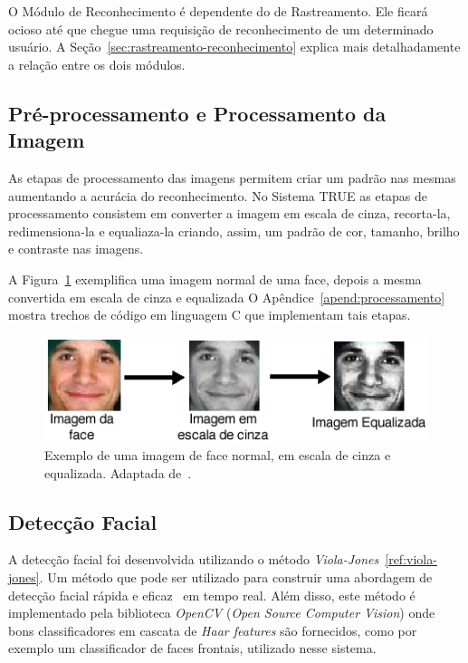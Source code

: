 	O Módulo de Reconhecimento é dependente do de Rastreamento. Ele ficará ocioso
	até que chegue uma requisição de reconhecimento de um determinado usuário. A
	Seção~\ref{sec:rastreamento-reconhecimento} explica mais detalhadamente a
	relação entre os dois módulos.

	\subsection{Pré-processamento e Processamento da Imagem}
		
		As etapas de processamento das imagens permitem criar um padrão nas mesmas
		aumentando a acurácia do reconhecimento. No Sistema TRUE as etapas de
		processamento consistem em converter a imagem em escala de cinza, recorta-la,
		redimensiona-la e equaliaza-la criando, assim, um padrão de cor, tamanho,
		brilho e contraste nas imagens.

		A Figura~\ref{fig:greyscale} exemplifica uma imagem normal de uma face,
		depois a mesma convertida em escala de cinza e equalizada O
		Apêndice~\ref{apend:processamento} mostra trechos de código em linguagem C
		que implementam tais etapas.

		\begin{figure}[hbt]
			\begin{center}
				\includegraphics[scale=0.7]{figuras/4.ProblemaEProposta/greyscale.png}
			\end{center}
			\caption{Exemplo de uma imagem de face normal, em escala de cinza e equalizada. Adaptada de~\cite{shervin}.}
			\label{fig:greyscale}
		\end{figure}

	\subsection{Detecção Facial}

		A detecção facial foi desenvolvida utilizando o método \textit{Viola-Jones}~\ref{ref:viola-jones}. Um método que pode ser utilizado para construir uma abordagem de detecção facial rápida e eficaz~\cite{violajones} em tempo real. Além disso, este método é implementado pela biblioteca \textit{OpenCV} (\textit{Open Source Computer Vision}) onde bons classificadores em cascata de \textit{Haar features} são fornecidos, como por exemplo um classificador de faces frontais, utilizado nesse sistema.

